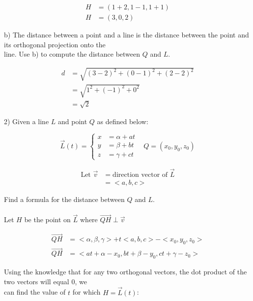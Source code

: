 \documentclass{article}
\begin{document}
\begin{align*}
H &= (1+2, 1-1, 1+1) \\
H &= (3, 0, 2)
\end{align*}

\begin{text}
\indent b) The distance between a point and a line is the distance between the point and its orthogonal projection onto the \\
\indent\indent\indent line.  Use b) to compute the distance between $Q$ and $L$.
\end{text}

\begin{align*}
d &= \sqrt{(3-2)^2 + (0-1)^2 + (2-2)^2} \\
  &= \sqrt{1^2 + (-1)^2 + 0^2} \\
  &= \sqrt{2}
\end{align*}

\newpage

\begin{text}
2) Given a line $L$ and point $Q$ as defined below:
\end{text}

\[\vec{L}(t) = \left\{
  \begin{array}{lr}
    x &= \alpha + at \\
    y &= \beta + bt \\
    z &= \gamma + ct
  \end{array}
\right.
\;\;\;
Q = (x_0, y_0, z_0)
\]

\begin{align*}
\text{Let } \vec{v} &= \text{direction vector of } \vec{L} \\
&= <a, b, c>
\end{align*}

\begin{text}
\indent Find a formula for the distance between $Q$ and $L$. \\ \\
\indent\indent Let $H$ be the point on $\vec{L}$ where $\vec{QH} \perp \vec{v}$
\end{text}

\begin{align*}
\vec{QH} &= <\alpha, \beta, \gamma> + t<a, b, c> - <x_0, y_0, z_0> \\
\vec{QH} &= <at + \alpha - x_0, bt + \beta - y_0, ct + \gamma - z_0>
\end{align*}

\begin{text}
\indent Using the knowledge that for any two orthogonal vectors, the dot product of the two vectors will equal $0$, we \\
\indent\indent can find the value of $t$ for which $H = \vec{L}(t)$:
\end{text}
\end{document}
